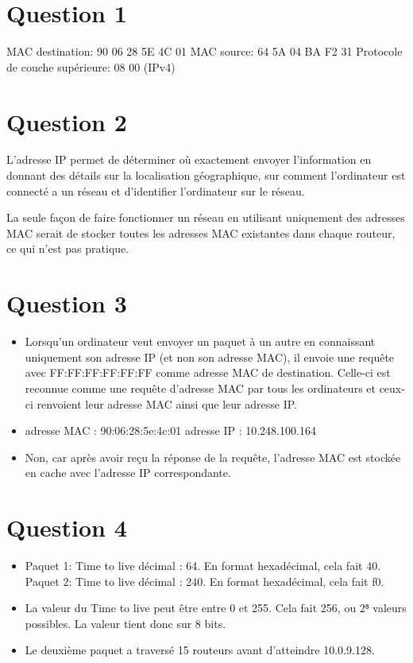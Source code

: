
\section{Question 1}
MAC destination: 90 06 28 5E 4C 01 
MAC source: 64 5A 04 BA F2 31
Protocole de couche supérieure: 08 00 (IPv4)
\section{Question 2}
L'adresse IP permet de déterminer où exactement envoyer l'information  en donnant des détails sur la localisation géographique, sur comment l'ordinateur est connecté a un réseau et d'identifier l'ordinateur sur le réseau.

La seule façon de faire fonctionner un réseau en
utilisant uniquement des adresses MAC serait de
stocker toutes les adresses MAC existantes dans
chaque routeur, ce qui n’est pas pratique.

\section{Question 3}
\begin{itemize}
	\item Lorsqu'un ordinateur veut envoyer un paquet à un autre en connaissant uniquement son adresse IP (et non son adresse MAC), il envoie une requête avec FF:FF:FF:FF:FF:FF comme adresse MAC de destination. Celle-ci est reconnue comme une requête d'adresse MAC par tous les ordinateurs et ceux-ci renvoient leur adresse MAC ainsi que leur adresse IP.
	\item adresse MAC : 90:06:28:5e:4c:01
	adresse IP : 10.248.100.164
	\item Non, car après avoir reçu la réponse de
	la requête, l'adresse MAC est stockée en cache
	 avec l'adresse IP correspondante.
\end{itemize}

\section{Question 4}
\begin{itemize}
	\item Paquet 1: Time to live décimal : 64. En format hexadécimal, cela fait 40. 
	Paquet 2: Time to live décimal : 240. En format hexadécimal, cela fait f0.
	\item La valeur du Time to live peut être entre 0 et 255. Cela fait 256, ou 2⁸ valeurs possibles. La valeur tient donc sur 8 bits.

	\item Le deuxième paquet a traversé 15 routeurs avant d'atteindre 10.0.9.128.
\end{itemize}

